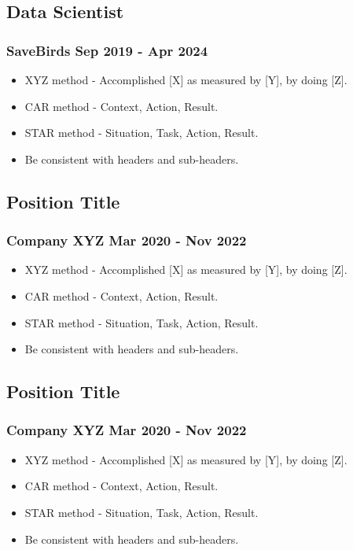 \documentclass[11pt]{article} %
\begin{document}
\subsection{Data Scientist}
\subsubsection{SaveBirds \hfill Sep 2019 - Apr 2024}
\begin{itemize}
	\item XYZ method - Accomplished [X] as measured by [Y], by doing [Z].
	\item CAR method - Context, Action, Result. 
	\item STAR method - Situation, Task, Action, Result.
	\item Be consistent with headers and sub-headers. 
\end{itemize}

\subsection{Position Title}
\subsubsection{Company XYZ \hfill Mar 2020 - Nov 2022}
\begin{itemize}
	\item XYZ method - Accomplished [X] as measured by [Y], by doing [Z].
	\item CAR method - Context, Action, Result. 
	\item STAR method - Situation, Task, Action, Result.
	\item Be consistent with headers and sub-headers. 
\end{itemize}

\subsection{Position Title}
\subsubsection{Company XYZ \hfill Mar 2020 - Nov 2022}
\begin{itemize}
	\item XYZ method - Accomplished [X] as measured by [Y], by doing [Z].
	\item CAR method - Context, Action, Result. 
	\item STAR method - Situation, Task, Action, Result.
	\item Be consistent with headers and sub-headers. 
\end{itemize}
\end{document}
